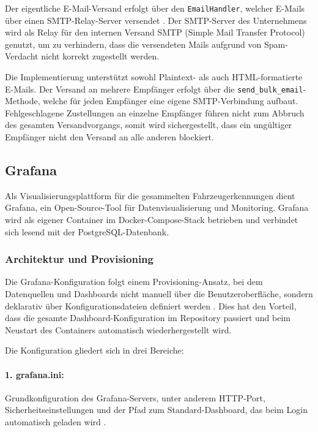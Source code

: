 Der eigentliche E-Mail-Versand erfolgt über den \texttt{EmailHandler}, welcher E-Mails über einen SMTP-Relay-Server versendet \cite{mailtrap_python_email}.
Der SMTP-Server des Unternehmens wird als Relay für den internen Versand SMTP (Simple Mail Transfer Protocol) genutzt, um zu verhindern, dass die versendeten Mails aufgrund von Spam-Verdacht nicht korrekt zugestellt werden. \cite{mailjet_smtp_relay}

Die Implementierung unterstützt sowohl Plaintext- als auch HTML-formatierte E-Mails.
Der Versand an mehrere Empfänger erfolgt über die \texttt{send\_bulk\_email}-Methode, welche für jeden Empfänger eine eigene SMTP-Verbindung aufbaut.
Fehlgeschlagene Zustellungen an einzelne Empfänger führen nicht zum Abbruch des gesamten Versandvorgangs, somit wird sichergestellt, dass ein ungültiger Empfänger nicht den Versand an alle anderen blockiert.


\subsection{Grafana}
\label{sec:grafana}

Als Visualisierungsplattform für die gesammelten Fahrzeugerkennungen dient Grafana, ein Open-Source-Tool für Datenvisualisierung und Monitoring. \cite{grafana}
Grafana wird als eigener Container im Docker-Compose-Stack betrieben und verbindet sich lesend mit der PostgreSQL-Datenbank.


\subsubsection{Architektur und Provisioning}

Die Grafana-Konfiguration folgt einem Provisioning-Ansatz, bei dem Datenquellen und Dashboards nicht manuell über die Benutzeroberfläche, sondern deklarativ über Konfigurationsdateien definiert werden \cite{grafana_provisioning}.
Dies hat den Vorteil, dass die gesamte Dashboard-Konfiguration im Repository passiert und beim Neustart des Containers automatisch wiederhergestellt wird.

Die Konfiguration gliedert sich in drei Bereiche:

\paragraph{1. grafana.ini:}
Grundkonfiguration des Grafana-Servers, unter anderem HTTP-Port, Sicherheitseinstellungen und der Pfad zum Standard-Dashboard, das beim Login automatisch geladen wird \cite{grafana_configure}.

